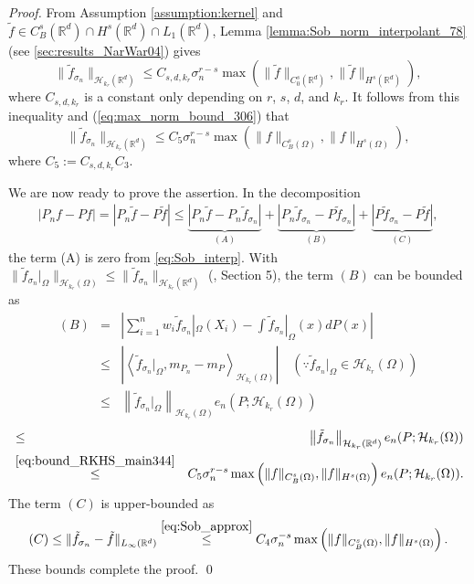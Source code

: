 \documentclass[11pt]{article}
\theoremstyle{remark}
\theoremstyle{example}
\theoremstyle{remark}
\renewcommand{\H}{{\mathcal{H}}}
\newcommand{\tf}{{\tilde{f}}}
\newcommand{\R}{\mathbb{R}}
\newcommand{\citep}{\cite}
\begin{document}
\begin{proof}
From Assumption \ref{assumption:kernel} and $\tf \in C_B^s(\R^d) \cap H^s(\R^d) \cap L_1(\R^d)$, Lemma \ref{lemma:Sob_norm_interpolant_78} (see \ref{sec:results_NarWar04}) gives 
\begin{equation*}
\| \tf_{\sigma_n} \|_{ \H_{k_r} (\R^d) } \leq C_{s,d,k_r} \sigma_n^{r-s} \max( \| \tf \|_{C_0^s(\R^d)}, \| \tf \|_{H^s(\R^d)}),
\end{equation*}
where $C_{s,d,k_r}$ is a constant only depending on $r$, $s$, $d$, and $k_r$.
It follows from this inequality and (\ref{eq:max_norm_bound_306}) that 
\begin{equation}
\| \tf_{\sigma_n} \|_{ \H_{k_r} (\R^d) }  
\leq  C_5 \sigma_n^{r-s}  \max \left(  \| f \|_{C_B^s(\Omega)}, \| f \|_{H^s(\Omega)}  \right),   \label{eq:bound_RKHS_main344}
\end{equation}
where $C_5 :=  C_{s,d,k_r} C_3$.

We are now ready to prove the assertion. 
In the decomposition 
\begin{eqnarray*} 
| P_n f - P f | = | P_n \tf - P \tf | \leq \underbrace{| P_n \tf - P_n \tf_{\sigma_n} |}_{(A)} +  \underbrace{| P_n \tf_{\sigma_n}  -  P \tf_{\sigma_n}|}_{(B)} +  \underbrace{| P \tf_{\sigma_n}  - P \tf |}_{(C)},
\end{eqnarray*}
the term (A) is zero from \eqref{eq:Sob_interp}. With $\| \tf_{\sigma_n} |_\Omega \|_{\H_{k_r}(\Omega)} \leq \| \tf_{\sigma_n} \|_{\H_{k_r}(\R^d)}$ (\citep{Aronszajn1950}{}{, Section 5}), 
the term $(B)$ can be bounded as 
\begin{eqnarray*}
(B) &=&  \left| \sum_{i=1}^n w_i \tf_{\sigma_n}|_\Omega (X_i) - \int \tf_{\sigma_n}   |_\Omega (x) dP(x) \right|\\
&\leq&  \left| \left< \tf_{\sigma_n} |_{\Omega}, m_{P_n} - m_P \right>_{\H_{k_r} (\Omega)} \right| \quad  (\because \tf_{\sigma_n} |_\Omega \in \H_{k_r} (\Omega))\\
&\leq&  \left\|  \tf_{\sigma_n} |_\Omega \right\|_{\H_{k_r}  (\Omega)}   e_n(P; \H_{k_r}  (\Omega) ) \nonumber
\end{eqnarray*}
\begin{eqnarray*}
&\leq &  \left\|  \tf_{\sigma_n} \right\|_{ \H_{k_r}  (\R^d)} e_n(P; \H_{k_r}  (\Omega) )  \nonumber\\
&\stackrel{\eqref{eq:bound_RKHS_main344}}{\leq}&  C_5  \sigma_n^{r-s} \max \left(  \| f \|_{C_B^s(\Omega)}, \| f \|_{H^s(\Omega)}  \right) e_n(P; \H_{k_r}  (\Omega) ).
\end{eqnarray*}
The term $(C)$ is upper-bounded as
\begin{equation*}
(C) \leq  \| \tf_{\sigma_n} - \tf \|_{L_\infty(\R^d)}
\stackrel{\eqref{eq:Sob_approx}}{\leq} C_4 \sigma_n^{-s}   \max \left(  \| f \|_{C_B^s(\Omega)}, \| f \|_{H^s(\Omega)}  \right).
\end{equation*}
These bounds complete the proof. \qed 
\end{proof}
\end{document}
